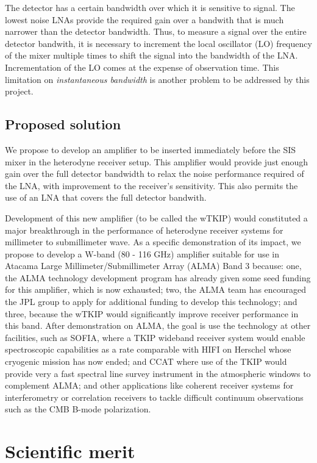The detector has a certain bandwidth over which it is sensitive to signal. The lowest noise LNAs provide the required gain over a bandwith that is much narrower than the detector bandwidth. Thus, to measure a signal over the entire detector bandwith, it is necessary to increment the local oscillator (LO) frequency of the mixer multiple times to shift the signal into the bandwidth of the LNA. Incrementation of the LO comes at the expense of observation time. This limitation on \emph{instantaneous bandwidth} is another problem to be addressed by this project. 

\subsection*{Proposed solution}
We propose to develop an amplifier to be inserted immediately before the SIS mixer in the heterodyne receiver setup. This amplifier would provide just enough gain over the full detector bandwidth to relax the noise performance required of the LNA, with improvement to the receiver's sensitivity. This also permits the use of an LNA that covers the full detector bandwith.
    
Development of this new amplifier (to be called the wTKIP) would constituted a major breakthrough in the performance of heterodyne receiver systems for millimeter to submillimeter wave. As a specific demonstration of its impact, we propose to develop a W-band  (80 - 116 GHz) amplifier suitable for use in Atacama Large Millimeter/Submillimeter Array (ALMA) Band 3 because: one, the ALMA technology development program has already given some seed funding for this amplifier, which is now exhausted; two, the ALMA team has encouraged the JPL group to apply for additional funding to develop this technology; and three, because the wTKIP would significantly improve receiver performance in this band. After demonstration on ALMA, the goal is use the technology at other facilities, such as SOFIA, where a TKIP wideband receiver system would enable spectroscopic capabilities as a rate comparable with HIFI on Herschel whose cryogenic mission has now ended; and CCAT where use of the TKIP would provide very a fast spectral line survey instrument in the atmospheric windows to complement ALMA; and other applications like coherent receiver systems for interferometry or correlation receivers to tackle difficult continuum observations such as the CMB B-mode polarization.  

\section*{Scientific merit}

